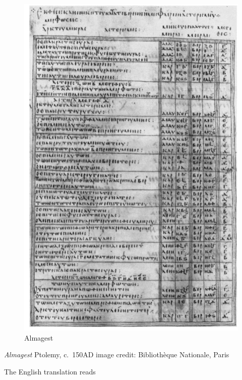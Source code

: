 \documentclass[
  letterpaper,
  DIV=11,
  numbers=noendperiod]{scrreprt}
\begin{document}
\begin{figure}

{\centering \includegraphics{img/Almagest.png}

}

\caption{Almagest}

\end{figure}

\emph{Almagest} Ptolemy, c.~150AD image credit: Bibliothèque Nationale,
Paris

The English translation reads
\end{document}
